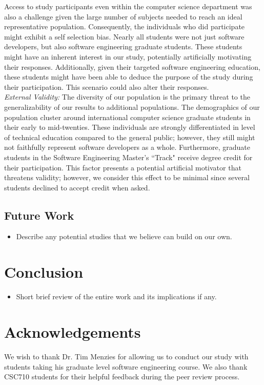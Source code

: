 \documentclass{sig-alternate-05-2015}
\begin{document}
Access to study participants even within the computer science department was also a challenge given the large number of subjects needed to reach an ideal representative population. Consequently, the individuals who did participate might exhibit a self selection bias. Nearly all students were not just software developers, but also software engineering graduate students. These students might have an inherent interest in our study, potentially artificially motivating their responses. Additionally, given their targeted software engineering education, these students might have been able to deduce the purpose of the study during their participation. This scenario could also alter their responses.\\

\emph{External Validity:} The diversity of our population is the primary threat to the generalizability of our results to additional populations. The demographics of our population cluster around international computer science graduate students in their early to mid-twenties. These individuals are strongly differentiated in level of technical education compared to the general public; however, they still might not faithfully represent software developers as a whole. Furthermore, graduate students in the Software Engineering Master's ``Track" receive degree credit for their participation. This factor presents a potential artificial motivator that threatens validity; however, we consider this effect to be minimal since several students declined to accept credit when asked.   

\subsection{Future Work}

\begin{itemize}
    \item Describe any potential studies that we believe can build on our own.
\end{itemize}

\section{Conclusion}
\begin{itemize}
    \item Short brief review of the entire work and its implications if any.
\end{itemize}

\section*{Acknowledgements}
We wish to thank Dr. Tim Menzies for allowing us to conduct our study with students taking his graduate level software engineering course. We also thank CSC710 students for their helpful feedback during the peer review process. 
\end{document}
